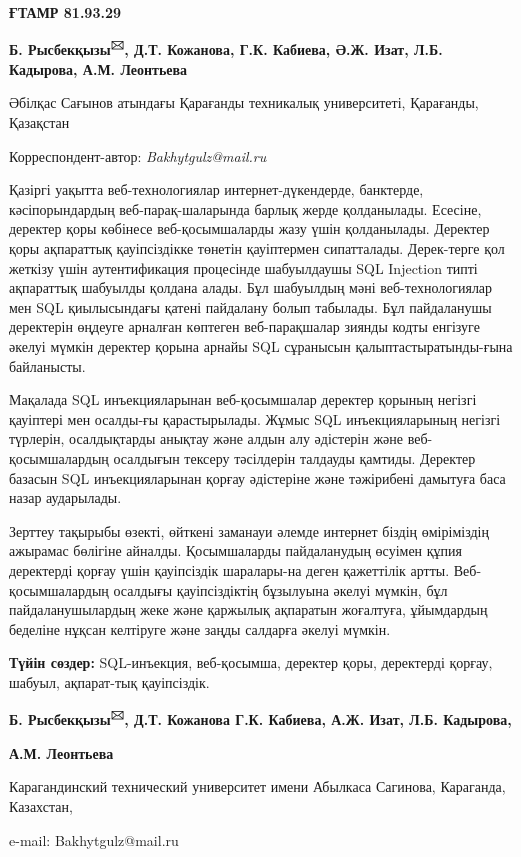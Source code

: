 
\newpage
{\bfseries ҒТАМР 81.93.29}

\begin{center}

{\bfseries Б. Рысбекқызы\textsuperscript{🖂}, Д.Т. Кожанова, Г.К. Кабиева,
Ә.Ж. Изат, Л.Б. Кадырова, А.М. Леонтьева}

Әбілқас Сағынов атындағы Қарағанды техникалық университеті, Қарағанды,
Қазақстан
\end{center}
Корреспондент-автор: \emph{Bakhytgulz@mail.ru}\vspace{0.5cm}

Қазіргі уақытта веб-технологиялар интернет-дүкендерде, банктерде,
кәсіпорындардың веб-парақ-шаларында барлық жерде қолданылады. Есесіне,
деректер қоры көбінесе веб-қосымшаларды жазу үшін қолданылады. Деректер
қоры ақпараттық қауіпсіздікке төнетін қауіптермен сипатталады.
Дерек-терге қол жеткізу үшін аутентификация процесінде шабуылдаушы SQL
Injection типті ақпараттық шабуылды қолдана алады. Бұл шабуылдың мәні
веб-технологиялар мен SQL қиылысындағы қатені пайдалану болып табылады.
Бұл пайдаланушы деректерін өңдеуге арналған көптеген веб-парақшалар
зиянды кодты енгізуге әкелуі мүмкін деректер қорына арнайы SQL сұранысын
қалыптастыратынды-ғына байланысты.

Мақалада SQL инъекцияларынан веб-қосымшалар деректер қорының негізгі
қауіптері мен осалды-ғы қарастырылады. Жұмыс SQL инъекцияларының негізгі
түрлерін, осалдықтарды анықтау және алдын алу әдістерін және
веб-қосымшалардың осалдығын тексеру тәсілдерін талдауды қамтиды.
Деректер базасын SQL инъекцияларынан қорғау әдістеріне және тәжірибені
дамытуға баса назар аударылады.

Зерттеу тақырыбы өзекті, өйткені заманауи әлемде интернет біздің
өміріміздің ажырамас бөлігіне айналды. Қосымшаларды пайдаланудың өсуімен
құпия деректерді қорғау үшін қауіпсіздік шаралары-на деген қажеттілік
артты. Веб-қосымшалардың осалдығы қауіпсіздіктің бұзылуына әкелуі
мүмкін, бұл пайдаланушылардың жеке және қаржылық ақпаратын жоғалтуға,
ұйымдардың беделіне нұқсан келтіруге және заңды салдарға әкелуі мүмкін.

{\bfseries Түйін сөздер:} SQL-инъекция, веб-қосымша, деректер қоры,
деректерді қорғау, шабуыл, ақпарат-тық қауіпсіздік.


\begin{center}
{\bfseries Б. Рысбекқызы\textsuperscript{🖂}, Д.Т. Кожанова Г.К. Кабиева,
А.Ж. Изат, Л.Б. Кадырова,}

{\bfseries А.М. Леонтьева}

Карагандинский технический университет имени Абылкаса Сагинова,
Караганда, Казахстан,

e-mail: Bakhytgulz@mail.ru
\end{center}

